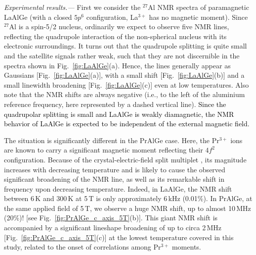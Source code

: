 \documentclass[aps,prb,a4paper,10pt,twocolumn,showpacs,floatfix,superscriptaddress,preprintnumbers,longbibliography]{revtex4-2}
\newcommand{\tcr}[1]{\textcolor{black}{#1}}
\begin{document}
\emph{Experimental results.---} First we consider the $^{27}$Al NMR
spectra of paramagnetic LaAlGe (with a closed $5p^6$ configuration, 
La$^{3+}$ has no magnetic moment). 
Since $^{27}$Al is a spin-5/2 nucleus, ordinarily we expect to observe 
five NMR lines, reflecting the quadrupole interaction of the non-spherical 
nucleus with its electronic surroundings. 
It turns out that the quadrupole splitting is quite small and the 
satellite signals rather weak, such that they are not discernible in 
the spectra shown in Fig.~\ref{fig:LaAlGe}(a).
Hence, the lines generally appear as Gaussians 
[Fig.~\ref{fig:LaAlGe}(a)], with a small shift [Fig.~\ref{fig:LaAlGe}(b)] 
and a small linewidth broadening [Fig.~\ref{fig:LaAlGe}(c)] even at low 
temperatures. 
Also note that the NMR shifts are always negative (i.e., to the left of 
the aluminium reference frequency, here represented by a dashed vertical 
line). \tcr{Since the quadrupolar splitting is small and  LaAlGe is 
weakly diamagnetic, the NMR behavior of LaAlGe is expected to be 
independent of the external magnetic field.}

The situation is significantly different in the PrAlGe case. Here, 
the Pr$^{3+}$ ions are known to carry a significant magnetic moment 
reflecting their $4f^{2}$ configuration. Because of the crystal-electric-field 
split multiplet \cite{Niksch1982,Hutchings1965}, its magnitude increases 
with decreasing temperature and is likely to cause the observed significant 
broadening of the NMR line, as well as its remarkable shift in frequency 
upon decreasing temperature.
Indeed, in LaAlGe, the NMR shift between 6\,K and
300\,K at 5\,T is only approximately 6\,kHz (0.01\%). In PrAlGe, at
the same applied field of 5\,T, we observe a huge NMR shift, up to
almost 10\,MHz (20\%)! [see Fig.~\ref{fig:PrAlGe_c_axis_5T}(b)]. This
giant NMR shift is accompanied by a significant lineshape broadening of
up to circa 2\,MHz  [Fig.~\ref{fig:PrAlGe_c_axis_5T}(c)] at the lowest
temperature covered in this study, related to the onset of 
correlations among Pr$^{3+}$ moments.
\end{document}
